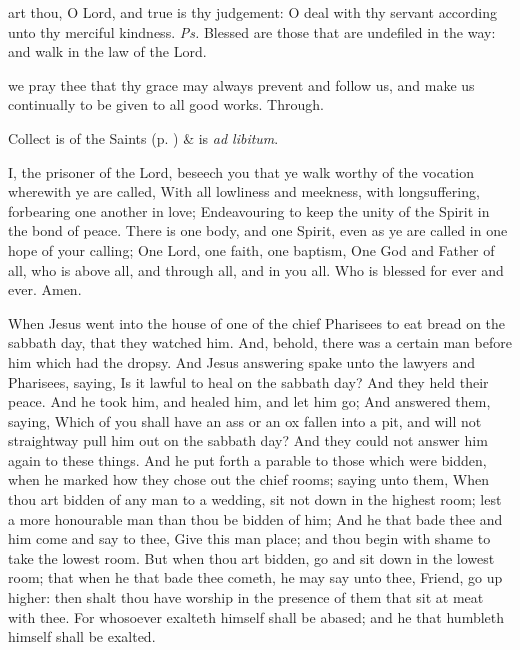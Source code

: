 \properantiphonfix

\introit
{} art thou, O Lord, and true is thy judgement: O deal with thy servant according unto thy merciful kindness. \textit{Ps.} Blessed are those that are undefiled in the way: and walk in the law of the Lord.

\collect
{} we pray thee that thy grace may always prevent and follow us, and make us continually to be given to all good works. Through.
\begin{rubric}
     Collect is of the Saints (p. \pageref{SPSaints}) \&  is \emph{ad libitum}.
\end{rubric}

 I, the prisoner of the Lord, beseech you that ye walk worthy of the vocation wherewith ye are called, With all lowliness and meekness, with longsuffering, forbearing one another in love; Endeavouring to keep the unity of the Spirit in the bond of peace. There is one body, and one Spirit, even as ye are called in one hope of your calling; One Lord, one faith, one baptism, One God and Father of all, who is above all, and through all, and in you all. Who is blessed for ever and ever. Amen.


 When Jesus went into the house of one of the chief Pharisees to eat bread on the sabbath day, that they watched him. And, behold, there was a certain man before him which had the dropsy. And Jesus answering spake unto the lawyers and Pharisees, saying, Is it lawful to heal on the sabbath day? And they held their peace. And he took him, and healed him, and let him go; And answered them, saying, Which of you shall have an ass or an ox fallen into a pit, and will not straightway pull him out on the sabbath day? And they could not answer him again to these things. And he put forth a parable to those which were bidden, when he marked how they chose out the chief rooms; saying unto them, When thou art bidden of any man to a wedding, sit not down in the highest room; lest a more honourable man than thou be bidden of him; And he that bade thee and him come and say to thee, Give this man place; and thou begin with shame to take the lowest room. But when thou art bidden, go and sit down in the lowest room; that when he that bade thee cometh, he may say unto thee, Friend, go up higher: then shalt thou have worship in the presence of them that sit at meat with thee. For whosoever exalteth himself shall be abased; and he that humbleth himself shall be exalted.

